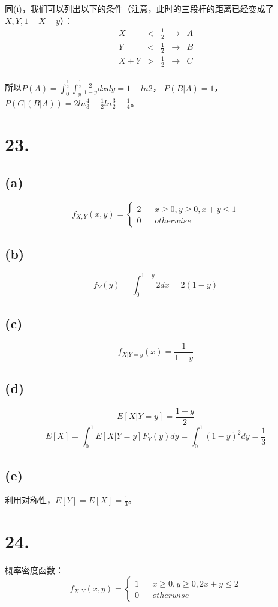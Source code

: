 \documentclass[UTF8]{report}
\begin{document}
            同(i)，我们可以列出以下的条件（注意，此时的三段杆的距离已经变成了$X, Y, 1 - X - y$）：
            $$\begin{array}{lccrr}
                X & < & \frac{1}{2} & \rightarrow & A\\
                Y & < & \frac{1}{2} & \rightarrow & B\\
                X + Y & > & \frac{1}{2} & \rightarrow & C\\
            \end{array}$$

            所以$P(A) = \int_{0}^{\frac{1}{2}}\int_{y}^{\frac{1}{2}}\frac{2}{1 - y}dxdy = 1 - ln2$，
            $P(B|A) = 1$，$P(C|(B|A)) = 2ln\frac{4}{3} + \frac{1}{2}ln\frac{3}{2} - \frac{1}{4}$。
    \section*{23.}
        \subsection*{(a)}
            $$f_{X, Y}(x, y) = \left\{
                \begin{array}{lcr}
                    2 & & x \geq 0, y \geq 0, x + y \leq 1\\
                    0 & & otherwise
                \end{array}
            \right.$$
        \subsection*{(b)}
            $$f_Y(y) = \int_{0}^{1 - y}2dx = 2(1 - y)$$
        \subsection*{(c)}
            $$f_{X|Y = y}(x) = \frac{1}{1 - y}$$
        \subsection*{(d)}
            $$E[X|Y = y] = \frac{1 - y}{2}$$
            $$E[X] = \int_{0}^{1}E[X|Y = y]F_{Y}(y)dy = \int_{0}^{1}(1 - y)^2dy = \frac{1}{3}$$
        \subsection*{(e)}
            利用对称性，$E[Y] = E[X] = \frac{1}{3}$。
    \section*{24.}
        概率密度函数：
        $$f_{X, Y}(x, y) = \left\{
            \begin{array}{lcr}
                1 & & x \geq 0, y \geq 0, 2x + y \leq 2\\
                0 & & otherwise
            \end{array}
        \right.$$
\end{document}
